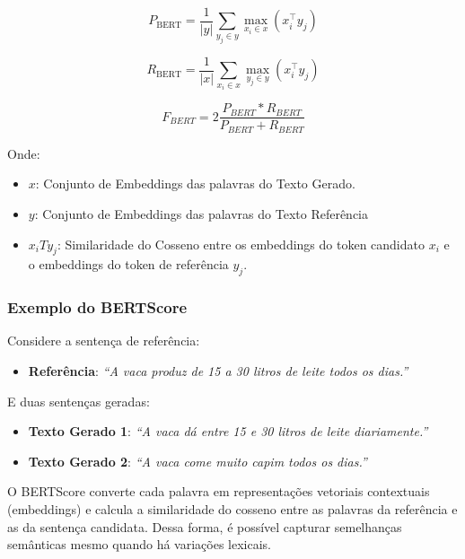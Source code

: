 \begin{equation}
\label{eq;precisonBert}
    P_{\text{BERT}} = \frac{1}{|y|} \sum_{y_j \in y} \max_{x_i \in x} (x_i^\top y_j)
\end{equation}

\begin{equation}
\label{eq;recallBert}
    R_{\text{BERT}} = \frac{1}{|x|} \sum_{x_i \in x} \max_{y_j \in y} (x_i^\top y_j)
\end{equation}

\begin{equation}
\label{eq;F1Bert}
    F_{BERT} = 2 \frac{P_{BERT} * R_{BERT}}{P_{BERT} + R_{BERT}}
\end{equation}


Onde:
\begin{itemize}
    \item \(x\): Conjunto de Embeddings das palavras do Texto Gerado.
    \item \(y\):  Conjunto de Embeddings das palavras do Texto Referência
    \item \(x_iT y_j\): Similaridade do Cosseno entre os embeddings do token candidato \(x_i\) e o embeddings do token de referência \(y_j\).
\end{itemize}

\subsubsection*{Exemplo do BERTScore}

Considere a sentença de referência:

\begin{itemize}
    \item \textbf{Referência}: \textit{``A vaca produz de 15 a 30 litros de leite todos os dias.''}
\end{itemize}

E duas sentenças geradas:

\begin{itemize}
    \item \textbf{Texto Gerado 1}: \textit{``A vaca dá entre 15 e 30 litros de leite diariamente.''}
    \item \textbf{Texto Gerado 2}: \textit{``A vaca come muito capim todos os dias.''}
\end{itemize}

O BERTScore converte cada palavra em representações vetoriais contextuais (embeddings) e calcula a similaridade do cosseno entre as palavras da referência e as da sentença candidata. Dessa forma, é possível capturar semelhanças semânticas mesmo quando há variações lexicais. 


